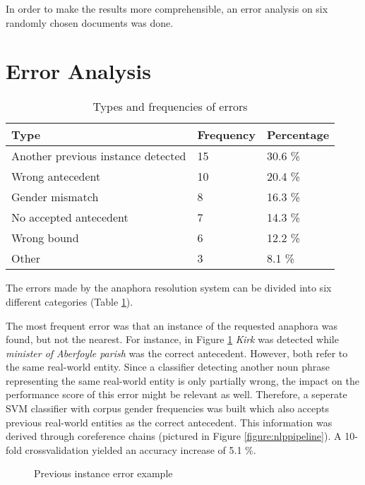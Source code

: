 In order to make the results more comprehensible, an error analysis on six randomly chosen documents was done.

\section{Error Analysis}
\begin{table}[h]
\centering
  \caption{Types and frequencies of errors}
\begin{tabular}{|l|l|l|}
	\hline
	Type & Frequency & Percentage \\ \hline
	\hline
	Another previous instance detected & 15 & 30.6 \% \\ \hline
	Wrong antecedent & 10 & 20.4 \% \\ \hline
	Gender mismatch & 8 & 16.3 \% \\ \hline
	No accepted antecedent & 7 & 14.3 \% \\ \hline
	Wrong bound & 6 & 12.2 \% \\ \hline
	Other & 3 & 8.1 \% \\ \hline
	\end{tabular}

     \label{table:errorFreq}
\end{table}

The errors made by the anaphora resolution system can be divided into six different categories (Table \ref{table:errorFreq}).

The most frequent error was that an instance of the requested anaphora was found, but not the nearest. For instance, in Figure \ref{figure:prevInstError} \textit{Kirk} was detected while \textit{minister of Aberfoyle parish} was the correct antecedent. However, both refer to the same real-world entity. Since a classifier detecting another noun phrase representing the same real-world entity is only partially wrong, the impact on the performance score of this error might be relevant as well. Therefore, a seperate SVM classifier with corpus gender frequencies was built which also accepts previous real-world entities as the correct antecedent. This information was derived through coreference chains (pictured in Figure \ref{figure:nlppipeline}). A 10-fold crossvalidation yielded an accuracy increase of 5.1 \%.

\begin{figure}[h]
\centering
\caption{Previous instance error example}
	\label{figure:prevInstError}
\end{figure}

